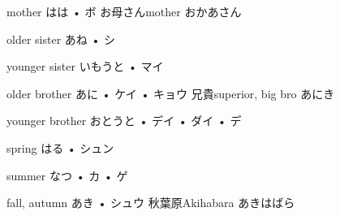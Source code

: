 



\setcounter{cardnum}{9}

		{mother}
		{はは • ボ}
		{お母さん}{mother おかあさん}
		{}{}
		{}{}
		{}{}
		{}{}

		{older sister}
		{あね • シ}
		{}{}
		{}{}
		{}{}
		{}{}
		{}{}

		{younger sister}
		{いもうと • マイ}
		{}{}
		{}{}
		{}{}
		{}{}
		{}{}

		{older brother}
		{あに • ケイ • キョウ}
		{兄貴}{superior, big bro あにき}
		{}{}
		{}{}
		{}{}
		{}{}

		{younger brother}
		{おとうと • デイ • ダイ • デ}
		{}{}
		{}{}
		{}{}
		{}{}
		{}{}

		{spring}
		{はる • シュン}
		{}{}
		{}{}
		{}{}
		{}{}
		{}{}

		{summer}
		{なつ • カ • ゲ}
		{}{}
		{}{}
		{}{}
		{}{}
		{}{}

		{fall, autumn}
		{あき • シュウ}
		{秋葉原}{Akihabara あきはばら}
		{}{}
		{}{}
		{}{}
		{}{}

